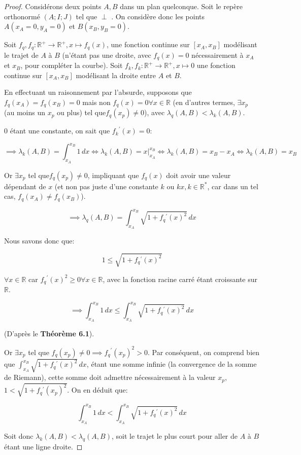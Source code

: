 \documentclass{amsart}
\theoremstyle{definition}
\theoremstyle{remark}
\numberwithin{equation}{section}
\renewcommand*{\overrightarrow}[1]{\vbox{\halign{##\cr 
  \tiny\rightarrowfill\cr\noalign{\nointerlineskip\vskip1pt} 
  $#1\mskip2mu$\cr}}}
\begin{document}
\begin{proof}
  Considérons deux points $A,B$ dans un plan quelconque. Soit le repère orthonormé $(A;I;J)$ tel que \overrightarrow{AJ} $\perp$ \overrightarrow{AB}. On considère donc les points $A(x_A=0,y_A=0)$ et $B(x_B,y_B=0)$.
  
  Soit $f_q, f_q:\mathbb{R^+}\longrightarrow \mathbb{R^+}, x\longmapsto f_q(x)$, une fonction continue sur $[x_A,x_B]$ modélisant le trajet de $A$ à $B$ (n'étant pas une droite, avec $f_q(x)=0$ nécessairement à $x_A$ et $x_B$, pour compléter la courbe). Soit $f_k, f_k:\mathbb{R^+}\longrightarrow \mathbb{R^+}, x\longmapsto 0$ une fonction
  continue sur $[x_A,x_B]$ modélisant la droite entre $A$ et $B$.
  
  En effectuant un raisonnement par l'absurde, supposons que $f_q(x_A)=f_q(x_B)=0$ mais non $f_q(x)=0 \forall x\in\mathbb{R}$ (en d'autres termes, $\exists x_p$ (au moins un $x_p$ ou plus) tel que$f_q(x_p)\ne0$), avec $\lambda_q(A,B) < \lambda_k(A,B)$.

  $0$ étant une constante, on sait que ${f_k}^\prime(x)=0$:

  \[\implies \lambda_k(A,B)=\int_{x_A}^{x_B}1 \,dx \Leftrightarrow \lambda_k(A,B)=x\Biggr|_{x_A}^{x_B} \Leftrightarrow \lambda_k(A,B)= x_B-x_A \Leftrightarrow \lambda_k(A,B)= x_B\]

  Or $\exists x_p$ tel que$f_q(x_p)\ne0$, impliquant que $f_q(x)$ doit avoir une valeur dépendant de $x$ (et non pas juste d'une constante $k$ ou $kx, k\in\mathbb{R^*}$, car dans un tel cas, $f_q(x_A)\ne f_q(x_B)$). 

  \[\implies \lambda_q(A,B)=\int_{x_A}^{x_B}\sqrt{1+f_q{^\prime}(x)^2} \,dx\]

  Nous savons donc que: 

  \[1 \leq \sqrt{1+f_q{^\prime}(x)^2}\] 
  
  $\forall x \in \mathbb{R}$ car $f_q{^\prime}(x)^2\geq 0 \forall x \in \mathbb{R}$, avec la fonction racine carré étant croissante sur $\mathbb{R}$.

  \[\implies \int_{x_A}^{x_B}1 \,dx \leq \int_{x_A}^{x_B}\sqrt{1+f_q{^\prime}(x)^2} \,dx\] 
  
  (D'après le \textbf{Théorème 6.1}).

  Or $\exists x_p$ tel que $f_q(x_p)\ne0 \implies {{f_q}^\prime(x_p)}^2>0$. Par conséquent, on comprend bien que $\int_{x_A}^{x_B}\sqrt{1+f_q{^\prime}(x)^2} \,dx$, étant une somme infinie (la convergence de la somme de Riemann), cette somme doit admettre nécessairement à la valeur $x_p$, $1<\sqrt{1+{f_q{^\prime}(x_p)}^2}$. On en déduit que: 

  \[ \int_{x_A}^{x_B}1 \,dx < \int_{x_A}^{x_B}\sqrt{1+f_q{^\prime}(x)^2} \,dx\] 
  
  Soit donc $\lambda_k(A,B) < \lambda_q(A,B)$, soit le trajet le plus court pour aller de $A$ à $B$ étant une ligne droite.
\end{proof}
\end{document}
